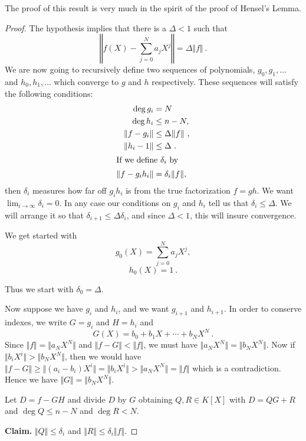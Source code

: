 The proof of this result is very much in the spirit of the proof of Hensel's Lemma.
\begin{proof}
The hypothesis implies that there is a $\Delta<1$ such that
$$
\left \Vert f(X)-\sum_{j=0}^{N}a_{j}X^{j}\right \Vert=\Delta\Vert f\Vert\ .
$$
We are now going to recursively define two sequences of polynomials, $g_{0},g_{1},\ldots$ and $h_{0},h_{1},\ldots$ which converge to $g$ and $h$ respectively. These sequences will satisfy the following conditions:
\begin{align*}
\deg g_{i}&=N\\
\deg h_{i}&\leq n-N,\\
\Vert f-g_{i}\Vert&\leq\Delta\Vert f\Vert\ ,\\
\Vert h_{i}-1\Vert&\leq\Delta\ .\\
\intertext{If we define $\delta_{i}$ by}
\Vert f-g_{i}h_{i}\Vert&=\delta_{i}\Vert f\Vert,
\end{align*}
then $\delta_{i}$ measures how far off $g_{i}h_{i}$ is from the true factorization $f=gh$. We want $\displaystyle \lim_{i\rightarrow\infty}\delta_{i}=0$. In any case our conditions on $g_{i}$ and $h_{i}$ tell us that $\delta_{i}\leq\Delta$. We will arrange it so that $\delta_{i+1}\leq\Delta\delta_{i}$, and since $\Delta<1$, this will insure convergence.

We get started with
$$
g_{0}(X)=\sum_{j=0}^{N}a_{j}X^{j},
$$
$$
h_{0}(X)=1\ .
$$

Thus we start with $\delta_{0}=\Delta$.

Now suppose we have $g_{i}$ and $h_{i}$, and we want $g_{i+1}$ and $h_{i+1}$. In order to conserve indexes, we write $G=g_{i}$ and $H=h_{i}$ and
$$
G(X)=b_{0}+b_{1}X+\cdots+b_{N}X^{N}\ .
$$
Since $\Vert f\Vert=\Vert a_{N}X^{N}\Vert$ and $\Vert f-G\Vert<\Vert f\Vert$, we must have $\Vert a_{N}X^{N}\Vert=\Vert b_{N}X^{N}\Vert$. Now if $\Vert b_{i}X^{i}\Vert>\Vert b_{N}X^{N}\Vert$, then we would have $\Vert f-G\Vert\geq\Vert(a_{i}-b_{i})X^{i}\Vert= \Vert b_{i}X^{i}\Vert>\Vert a_{N}X^{N}\Vert=\Vert f\Vert$ which is a contradiction. Hence we have $\Vert G\Vert= \Vert b_{N}X^{N}\Vert$.

Let $D=f-GH$ and divide $D$ by $G$ obtaining $Q,R\in K[X]$ with $D=QG+R$ and $\deg Q\leq n-N$ and $\deg R<N$.

\textbf{Claim.} $\Vert Q\Vert\leq\delta_{i}$ and $\Vert R\Vert\leq\delta_{i}\Vert f\Vert$.


\end{proof}
